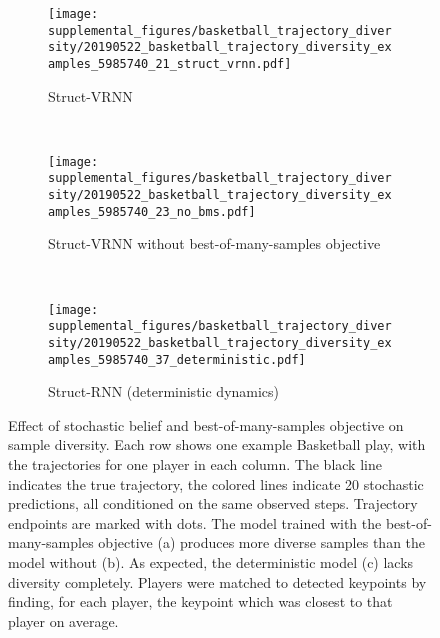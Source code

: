  
\begin{figure*}[t]
    \centering
    \begin{subfigure}[t]{0.6\textwidth}
        \texttt{[image: supplemental\_figures/basketball\_trajectory\_diversity/20190522\_basketball\_trajectory\_diversity\_examples\_5985740\_21\_struct\_vrnn.pdf]}
        \caption{Struct-VRNN}
    \end{subfigure}\\
    \vspace{0.2in}
    \begin{subfigure}[t]{0.6\textwidth}
        \texttt{[image: supplemental\_figures/basketball\_trajectory\_diversity/20190522\_basketball\_trajectory\_diversity\_examples\_5985740\_23\_no\_bms.pdf]}
        \caption{Struct-VRNN without best-of-many-samples objective}
    \end{subfigure}\\
    \vspace{0.2in}
    \begin{subfigure}[t]{0.6\textwidth}
        \texttt{[image: supplemental\_figures/basketball\_trajectory\_diversity/20190522\_basketball\_trajectory\_diversity\_examples\_5985740\_37\_deterministic.pdf]}
        \caption{Struct-RNN (deterministic dynamics)}
    \end{subfigure}
    \caption{Effect of stochastic belief and best-of-many-samples objective on sample diversity. Each row shows one example Basketball play, with the trajectories for one player in each column. The black line indicates the true trajectory, the colored lines indicate 20 stochastic predictions, all conditioned on the same observed steps. Trajectory endpoints are marked with dots. The model trained with the best-of-many-samples objective (a) produces more diverse samples than the model without (b). As expected, the deterministic model (c) lacks diversity completely. Players were matched to detected keypoints by finding, for each player, the keypoint which was closest to that player on average.}
    \label{fig:basketball_diversity}
\end{figure*} 
